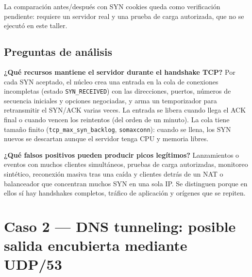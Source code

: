 La comparación antes/después con SYN cookies queda como verificación pendiente: requiere un servidor real y una prueba de carga autorizada, que no se ejecutó en este taller.

\subsection{Preguntas de análisis}

\textbf{¿Qué recursos mantiene el servidor durante el handshake TCP?} Por cada SYN aceptado, el núcleo crea una entrada en la cola de conexiones incompletas (estado \texttt{SYN\_RECEIVED}) con las direcciones, puertos, números de secuencia iniciales y opciones negociadas, y arma un temporizador para retransmitir el SYN/ACK varias veces. La entrada se libera cuando llega el ACK final o cuando vencen los reintentos (del orden de un minuto). La cola tiene tamaño finito (\texttt{tcp\_max\_syn\_backlog}, \texttt{somaxconn}): cuando se llena, los SYN nuevos se descartan aunque el servidor tenga CPU y memoria libres.

\textbf{¿Qué falsos positivos pueden producir picos legítimos?} Lanzamientos o eventos con muchos clientes simultáneos, pruebas de carga autorizadas, monitoreo sintético, reconexión masiva tras una caída y clientes detrás de un NAT o balanceador que concentran muchos SYN en una sola IP. Se distinguen porque en ellos sí hay handshakes completos, tráfico de aplicación y orígenes que se repiten.

\section{Caso 2 --- DNS tunneling: posible salida encubierta mediante UDP/53}

 


